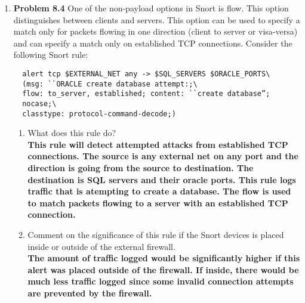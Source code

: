 \documentclass[12pt]{article}
\begin{document}
\begin{enumerate}
  \item \textbf{Problem 8.4} One of the non-payload options in Snort is flow. This option distinguishes between clients and servers. This option can be used to specify a match only for packets flowing in one direction (client to server or visa-versa) and can specify a match only on established TCP connections. Consider the following Snort rule: \\

  {\color{blue}
  \begin{verbatim}
  alert tcp $EXTERNAL_NET any -> $SQL_SERVERS $ORACLE_PORTS\
  (msg: ``ORACLE create database attempt:;\
  flow: to_server, established; content: ``create database”;
  nocase;\
  classtype: protocol-command-decode;)
  \end{verbatim}
  }

  \begin{enumerate}
  \item {What does this rule do?} \\

  \textbf{This rule will detect attempted attacks from established TCP connections. The source is any external net on any port and the direction is going from the source to destination. The destination is SQL servers and their oracle ports. This rule logs traffic that is atempting to create a database. The flow is used to match packets flowing to a server with an established TCP connection.} \\

  \item {Comment on the significance of this rule if the Snort devices is placed inside or outside of the external firewall.} \\

  \textbf{The amount of traffic logged would be significantly higher if this alert was placed outside of the firewall. If inside, there would be much less traffic logged since some invalid connection attempts are prevented by the firewall.} \\

  \end{enumerate}


\end{enumerate}
\end{document}
